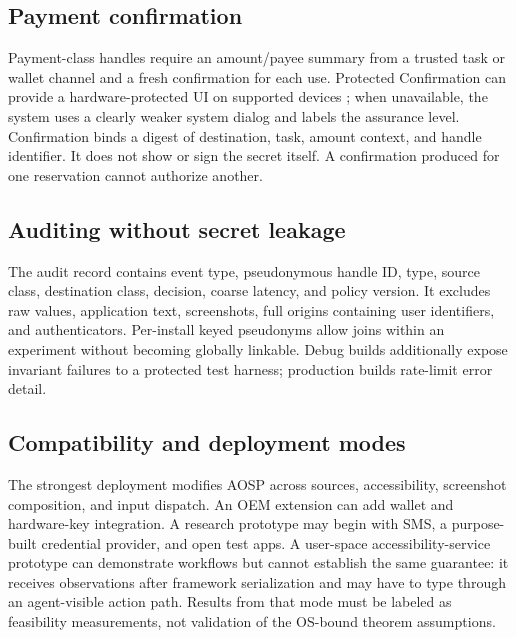 \subsection{Payment confirmation}

Payment-class handles require an amount/payee summary from a trusted task or wallet channel and a fresh confirmation for each use. Protected Confirmation can provide a hardware-protected UI on supported devices \cite{androidProtectedConfirmation}; when unavailable, the system uses a clearly weaker system dialog and labels the assurance level. Confirmation binds a digest of destination, task, amount context, and handle identifier. It does not show or sign the secret itself. A confirmation produced for one reservation cannot authorize another.

\subsection{Auditing without secret leakage}

The audit record contains event type, pseudonymous handle ID, type, source class, destination class, decision, coarse latency, and policy version. It excludes raw values, application text, screenshots, full origins containing user identifiers, and authenticators. Per-install keyed pseudonyms allow joins within an experiment without becoming globally linkable. Debug builds additionally expose invariant failures to a protected test harness; production builds rate-limit error detail.

\subsection{Compatibility and deployment modes}

The strongest deployment modifies AOSP across sources, accessibility, screenshot composition, and input dispatch. An OEM extension can add wallet and hardware-key integration. A research prototype may begin with SMS, a purpose-built credential provider, and open test apps. A user-space accessibility-service prototype can demonstrate workflows but cannot establish the same guarantee: it receives observations after framework serialization and may have to type through an agent-visible action path. Results from that mode must be labeled as feasibility measurements, not validation of the OS-bound theorem assumptions.

